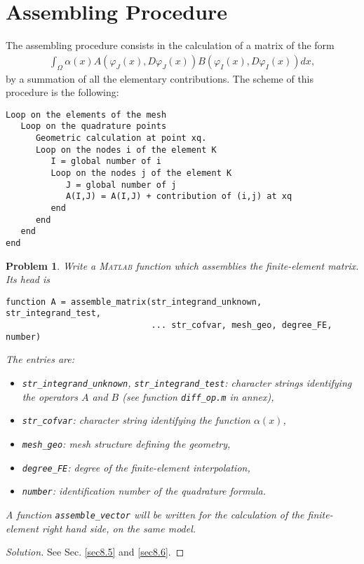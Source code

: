 \documentclass[11pt,a4paper,center,notitlepage]{article}
\numberwithin{equation}{section}
\newtheorem{prob}{Problem}[section]
\begin{document}
\section{Assembling Procedure}
The assembling procedure consists in the calculation of a matrix of the form
\begin{align}
\int_\Omega  {\alpha \left( x \right)A\left( {{\varphi _J}\left( x \right),D{\varphi _J}\left( x \right)} \right)B\left( {{\varphi _I}\left( x \right),D{\varphi _I}\left( x \right)} \right)dx} ,
\end{align}
by a summation of all the elementary contributions. The scheme of this procedure is the following: 
\begin{verbatim}
Loop on the elements of the mesh
   Loop on the quadrature points
      Geometric calculation at point xq.
      Loop on the nodes i of the element K
         I = global number of i
         Loop on the nodes j of the element K
            J = global number of j 
            A(I,J) = A(I,J) + contribution of (i,j) at xq      
         end
      end
   end
end
\end{verbatim}

\begin{prob}
Write a \textsc{Matlab} function which assemblies the finite-element matrix. Its head is 
\begin{verbatim}
function A = assemble_matrix(str_integrand_unknown, str_integrand_test, 
                             ... str_cofvar, mesh_geo, degree_FE, number)
\end{verbatim}
The entries are:
\begin{itemize}
\item \verb|str_integrand_unknown|, \verb|str_integrand_test|: character strings identifying the operators $A$ and $B$ (see function \verb|diff_op.m| in annex),
\item \verb|str_cofvar|: character string identifying the function $\alpha \left(x\right)$,
\item \verb|mesh_geo|: mesh structure defining the geometry,
\item \verb|degree_FE|: degree of the finite-element interpolation,
\item \verb|number|: identification number of the quadrature formula.
\end{itemize}
A function \verb|assemble_vector| will be written for the calculation of the finite-element right hand side, on the same model.
\end{prob}

\begin{proof}[Solution]
See Sec. \ref{sec8.5} and \ref{sec8.6}.
\end{proof}
\end{document}
